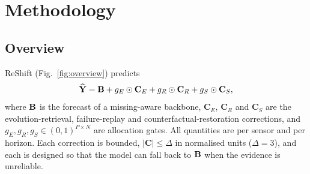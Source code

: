 \section{Methodology}
\label{sec:method}

\subsection{Overview}
ReShift (Fig.~\ref{fig:overview}) predicts
\begin{equation}
\widehat{\mathbf{Y}}=\mathbf{B}+g_E\odot\mathbf{C}_E+g_R\odot\mathbf{C}_R+g_S\odot\mathbf{C}_S ,
\label{eq:reshift}
\end{equation}
where $\mathbf{B}$ is the forecast of a missing-aware backbone, $\mathbf{C}_E$, $\mathbf{C}_R$ and $\mathbf{C}_S$ are the evolution-retrieval, failure-replay and counterfactual-restoration corrections, and $g_E,g_R,g_S\in(0,1)^{P\times N}$ are allocation gates. All quantities are per sensor and per horizon. Each correction is bounded, $|\mathbf{C}|\le\Delta$ in normalised units ($\Delta=3$), and each is designed so that the model can fall back to $\mathbf{B}$ when the evidence is unreliable.


